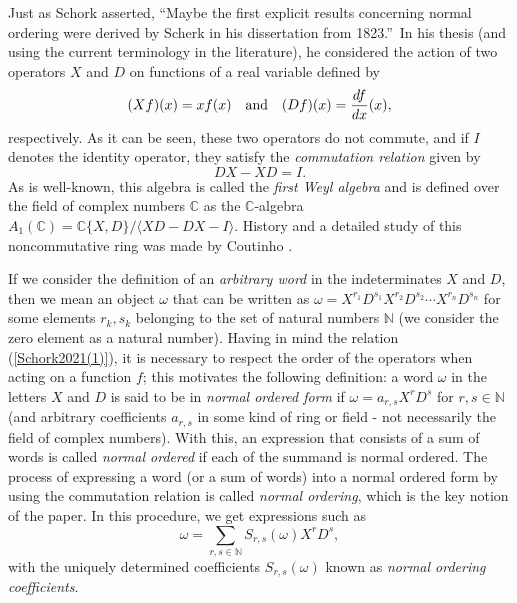 \documentclass{amsart}
\theoremstyle{definition}
\theoremstyle{remark}
\numberwithin{equation}{section}
\begin{document}
Just as Schork \cite[Section 1]{Schork2021} asserted, \textquotedblleft Maybe the first explicit results concerning normal ordering were derived by Scherk \cite{Scherk1823} in his dissertation from 1823.\textquotedblright\ In his thesis (and using the current terminology in the literature), he considered the action of two operators $X$ and $D$ on functions of a real variable defined by
\begin{equation}\label{Schork2021(0)}
(Xf)(x) = xf(x) \quad {\rm and} \quad (Df)(x) = \frac{df}{dx}(x),
\end{equation}
respectively. As it can be seen, these two operators do not commute, and if $I$ denotes the identity operator, they satisfy the {\em commutation relation} given by
\begin{equation}\label{Schork2021(1)}
DX - XD = I.
\end{equation}
As is well-known, this algebra is called the {\em first Weyl algebra} and is defined over the field of complex numbers $\mathbb{C}$ as the $\mathbb{C}$-algebra $A_1(\mathbb{C}) = \mathbb{C} \{X, D\} / \langle XD - DX - I\rangle$. History and a detailed study of this noncommutative ring was made by Coutinho \cite{Coutinho1995}.

If we consider the definition of an {\em arbitrary word} in the indeterminates $X$ and $D$, then we mean an object $\omega$ that can be written as $\omega = X^{r_1} D^{s_1} X^{r_2} D^{s_2} \dotsb X^{r_n} D^{s_n} $ for some elements $r_k, s_k$ belonging to the set of natural numbers $\mathbb{N}$ (we consider the zero element as a natural number). Having in mind the relation (\ref{Schork2021(1)}), it is necessary to respect the order of the operators when acting on a function $f$; this motivates the following definition: a word $\omega$ in the letters $X$ and $D$ is said to be in {\em normal ordered form} if $\omega = a_{r, s}X^r D^s$ for $r, s \in \mathbb{N}$ (and arbitrary coefficients $a_{r,s}$ in some kind of ring or field - not necessarily the field of complex numbers). With this, an expression that consists of a sum of words is called {\em normal ordered} if each of the summand is normal ordered. The process of expressing a word (or a sum of words) into a normal ordered form by using the commutation relation is called {\em normal ordering}, which is the key notion of the paper. In this procedure, we get expressions such as
\begin{equation}\label{Schork2021(2)}
\omega = \sum_{r, s \in \mathbb{N}} S_{r,s}(\omega) X^rD^s,
\end{equation}
with the uniquely determined coefficients $S_{r,s}(\omega)$ known as {\em normal ordering coefficients}.
\end{document}
